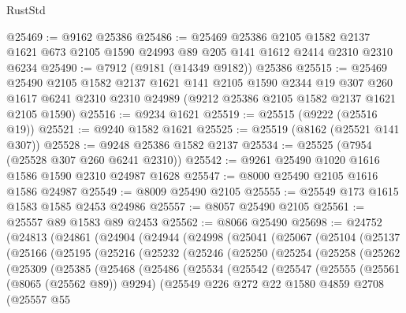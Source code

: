 \begin{lexlean}{RustStd}
\begin{coremodule}
@25469 := @9162 @25386
@25486 := @25469
    @25386
    @2105
    @1582
    @2137
    @1621
    @673
    @2105
    @1590
    @24993
    @89
    @205
    @141
    @1612
    @2414
    @2310
    @2310
    @6234
@25490 := @7912 (@9181 (@14349 @9182)) @25386
@25515 := @25469
    @25490
    @2105
    @1582
    @2137
    @1621
    @141
    @2105
    @1590
    @2344
    @19
    @307
    @260
    @1617
    @6241
    @2310
    @2310
    @24989
    (@9212 @25386 @2105 @1582 @2137 @1621 @2105 @1590)
@25516 := @9234 @1621
@25519 := @25515 (@9222 (@25516 @19))
@25521 := @9240 @1582 @1621
@25525 := @25519 (@8162 (@25521 @141 @307))
@25528 := @9248 @25386 @1582 @2137
@25534 := @25525 (@7954 (@25528 @307 @260 @6241 @2310))
@25542 := @9261 @25490 @1020 @1616 @1586 @1590 @2310 @24987 @1628
@25547 := @8000 @25490 @2105 @1616 @1586 @24987
@25549 := @8009 @25490 @2105
@25555 := @25549 @173 @1615 @1583 @1585 @2453 @24986
@25557 := @8057 @25490 @2105
@25561 := @25557 @89 @1583 @89 @2453
@25562 := @8066 @25490
@25698 := @24752
    (@24813
      (@24861
        (@24904
          (@24944
            (@24998
              (@25041
                (@25067
                  (@25104
                    (@25137
                      (@25166
                        (@25195
                          (@25216
                            (@25232
                              (@25246
                                (@25250
                                  (@25254
                                    (@25258
                                      (@25262
                                        (@25309
                                          (@25385
                                            (@25468
                                              (@25486
                                                (@25534
                                                  (@25542
                                                    (@25547
                                                      (@25555
                                                        (@25561 (@8065 (@25562 @89)) @9294)
                                                        (@25549
                                                          @226
                                                          @272
                                                          @22
                                                          @1580
                                                          @4859
                                                          @2708
                                                          (@25557
                                                            @55

\end{coremodule}
\end{lexlean}
